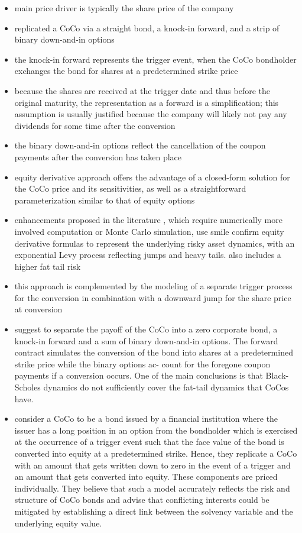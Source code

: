 \begin{itemize}
\item main price driver is typically the share price of the company
\item \citet{de2011pricing} replicated a CoCo via a straight bond, a knock-in forward, and a strip of binary down-and-in options
\item the knock-in forward represents the trigger event, when the CoCo bondholder exchanges the bond for shares at a predetermined strike price 
\item because the shares are received at the trigger date and thus before the original maturity, the representation as a forward is a simplification; this assumption is usually justified because the company will likely not pay any dividends for some time after the conversion
\item the binary down-and-in options reflect the cancellation of the coupon payments after the conversion has taken place
\item equity derivative approach offers the advantage of a closed-form solution for the CoCo price and its sensitivities, as well as a straightforward parameterization similar to that of equity options
\item enhancements proposed in the literature \citet{corcuera2014close}, which require numerically more involved computation or Monte Carlo simulation, use smile confirm equity derivative formulas to represent the underlying risky asset dynamics, with an exponential Levy process reflecting jumps and heavy tails. \citet{teneberg2012equity} also includes a higher fat tail risk
\item this approach is complemented by the modeling of a separate trigger process for the conversion in combination with a downward jump for the share price at conversion \citet{de2011pricing}
\item \citet{de2011pricing} suggest to separate the payoff of the CoCo into a zero corporate bond, a knock-in forward and a sum of binary down-and-in options. The forward contract simulates the conversion of the bond into shares at a predetermined strike price while the binary options ac- count for the foregone coupon payments if a conversion occurs. One of the main conclusions is that Black-Scholes dynamics do not sufficiently cover the fat-tail dynamics that CoCos have.
\item \citet{henriques2011making} consider a CoCo to be a bond issued by a financial institution where the issuer has a long position in an option from the bondholder which is exercised at the occurrence of a trigger event such that the face value of the bond is converted into equity at a predetermined strike. Hence, they replicate a CoCo with an amount that gets written down to zero in the event of a trigger and an amount that gets converted into equity. These components are priced individually. They believe that such a model accurately reflects the risk and structure of CoCo bonds and advise that conflicting interests could be mitigated by establishing a direct link between the solvency variable and the underlying equity value.

\end{itemize}
